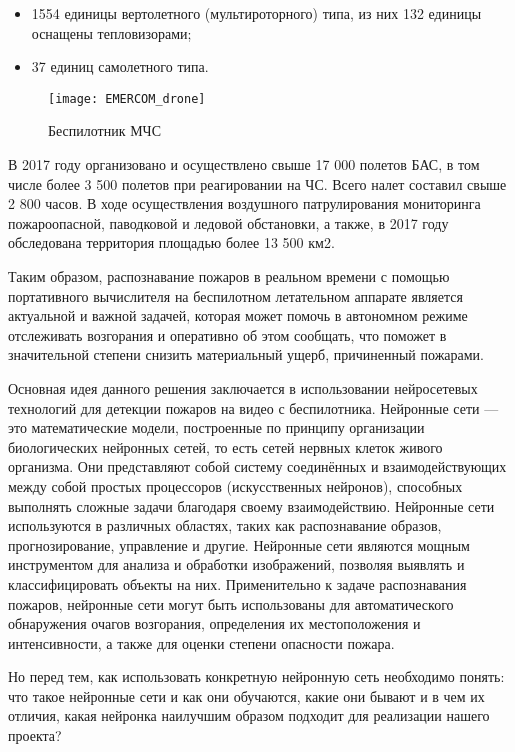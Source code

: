     \begin{itemize}
        \item 1554 единицы вертолетного (мультироторного) типа, из них 132 единицы оснащены тепловизорами;
        \item 37 единиц самолетного типа.
    \end{itemize}

    \begin{figure}[ht]
        \centering
        \texttt{[image: EMERCOM\_drone]}
        \caption{Беспилотник МЧС}
        \label{fig:EMERCOM_drone}
    \end{figure}

    В 2017 году организовано и осуществлено свыше 17 000 полетов БАС, в том числе более 3 500 полетов при реагировании на ЧС. Всего налет составил свыше 2 800 часов. В ходе осуществления воздушного патрулирования мониторинга пожароопасной, паводковой и ледовой обстановки, а также, в 2017 году обследована территория площадью более 13 500 км2.

    Таким образом, распознавание пожаров в реальном времени с помощью портативного вычислителя на беспилотном летательном аппарате является актуальной и важной задачей, которая может помочь в автономном режиме отслеживать возгорания и оперативно об этом сообщать, что поможет в значительной степени снизить материальный ущерб, причиненный пожарами.

    Основная идея данного решения заключается в использовании нейросетевых технологий для детекции пожаров на видео с беспилотника. Нейронные сети — это математические модели, построенные по принципу организации биологических нейронных сетей, то есть сетей нервных клеток живого организма. Они представляют собой систему соединённых и взаимодействующих между собой простых процессоров (искусственных нейронов), способных выполнять сложные задачи благодаря своему взаимодействию. Нейронные сети используются в различных областях, таких как распознавание образов, прогнозирование, управление и другие. Нейронные сети являются мощным инструментом для анализа и обработки изображений, позволяя выявлять и классифицировать объекты на них. Применительно к задаче распознавания пожаров, нейронные сети могут быть использованы для автоматического обнаружения очагов возгорания, определения их местоположения и интенсивности, а также для оценки степени опасности пожара.

    Но перед тем, как использовать конкретную нейронную сеть необходимо понять: что такое нейронные сети и как они обучаются, какие они бывают и в чем их отличия, какая нейронка наилучшим образом подходит для реализации нашего проекта?

